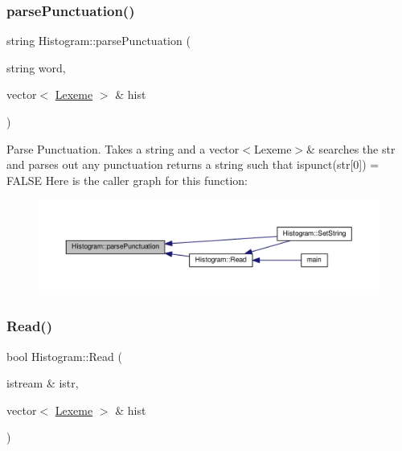 \subsubsection{\texorpdfstring{parse\+Punctuation()}{parsePunctuation()}}
{\footnotesize\ttfamily string Histogram\+::parse\+Punctuation (\begin{DoxyParamCaption}\item[{string}]{word,  }\item[{vector$<$ \hyperlink{class_lexeme}{Lexeme} $>$ \&}]{hist }\end{DoxyParamCaption})}

Parse Punctuation. Takes a string and a vector$<$\+Lexeme$>$\& searches the str and parses out any punctuation returns a string such that ispunct(str\mbox{[}0\mbox{]}) = F\+A\+L\+SE Here is the caller graph for this function\+:
\nopagebreak
\begin{figure}[H]
\begin{center}
\leavevmode
\includegraphics[width=350pt]{class_histogram_aa1ae3a4f490aef85530afc028867b8f4_icgraph}
\end{center}
\end{figure}
\mbox{\label{class_histogram_afbdf1d9a97070fd3724dbe55fd9f8570}} 
\subsubsection{\texorpdfstring{Read()}{Read()}}
{\footnotesize\ttfamily bool Histogram\+::\+Read (\begin{DoxyParamCaption}\item[{istream \&}]{istr,  }\item[{vector$<$ \hyperlink{class_lexeme}{Lexeme} $>$ \&}]{hist }\end{DoxyParamCaption})}

